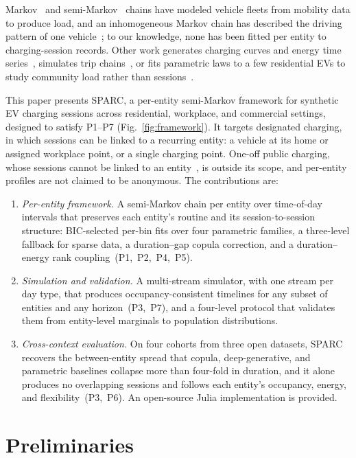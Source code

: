\documentclass[journal]{IEEEtran}
\begin{document}
Markov~\cite{shepero2018} and semi-Markov~\cite{rolink2013} chains have modeled vehicle fleets from mobility data to produce load, and an inhomogeneous Markov chain has described the driving pattern of one vehicle~\cite{iversen2016inhomogeneous}; to our knowledge, none has been fitted per entity to charging-session records. Other work generates charging curves and energy time series~\cite{li2024diffcharge,razghandi2023,lin2025energydiff,hu2023multiload}, simulates trip chains~\cite{tang2024modeling,xiong2026llm}, or fits parametric laws to a few residential EVs to study community load rather than sessions~\cite{wang2026identification}.

This paper presents SPARC, a per-entity semi-Markov framework for synthetic EV charging sessions across residential, workplace, and commercial settings, designed to satisfy P1--P7 (Fig.~\ref{fig:framework}). It targets designated charging, in which sessions can be linked to a recurring entity: a vehicle at its home or assigned workplace point, or a single charging point. One-off public charging, whose sessions cannot be linked to an entity~\cite{jonas2023electric}, is outside its scope, and per-entity profiles are not claimed to be anonymous. The contributions are:
\begin{enumerate}
\item \emph{Per-entity framework.} A semi-Markov chain per entity over time-of-day intervals that preserves each entity's routine and its session-to-session structure: BIC-selected per-bin fits over four parametric families, a three-level fallback for sparse data, a duration--gap copula correction, and a duration--energy rank coupling~(P1,~P2,~P4,~P5).
\item \emph{Simulation and validation.} A multi-stream simulator, with one stream per day type, that produces occupancy-consistent timelines for any subset of entities and any horizon~(P3,~P7), and a four-level protocol that validates them from entity-level marginals to population distributions.
\item \emph{Cross-context evaluation.} On four cohorts from three open datasets, SPARC recovers the between-entity spread that copula, deep-generative, and parametric baselines collapse more than four-fold in duration, and it alone produces no overlapping sessions and follows each entity's occupancy, energy, and flexibility~(P3,~P6). An open-source Julia implementation is provided.
\end{enumerate}


\section{Preliminaries}
\label{sec:preliminaries}
\end{document}
